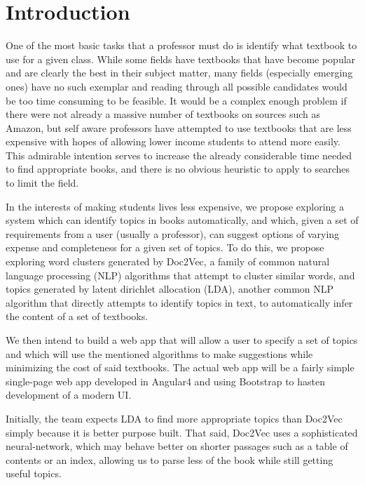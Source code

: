
\section{Introduction}
One of the most basic tasks that a professor must do is identify what textbook to use for a given class.
While some fields have textbooks that have become popular and are clearly the best in their subject matter, many fields (especially emerging ones) have no such exemplar and reading through all possible candidates would be too time consuming to be feasible.  
It would be a complex enough problem if there were not already a massive number of textbooks on sources such as Amazon, but self aware professors have attempted to use textbooks that are less expensive with hopes of allowing lower income students to attend more easily.  
This admirable intention serves to increase the already considerable time needed to find appropriate books, and there is no obvious heuristic to apply to searches to limit the field.  

In the interests of making students lives less expensive, we propose exploring a system which can identify topics in books automatically, and which, given a set of requirements from a user (usually a professor), can suggest options of varying expense and completeness for a given set of topics.  
To do this, we propose exploring word clusters generated by Doc2Vec, a family of common natural language processing (NLP) algorithms that attempt to cluster similar words, and topics generated by latent dirichlet allocation (LDA), another common NLP algorithm that directly attempts to identify topics in text, to automatically infer the content of a set of textbooks.  

We then intend to build a web app that will allow a user to specify a set of topics and which will use the mentioned algorithms to make suggestions while minimizing the cost of said textbooks.  
The actual web app will be a fairly simple single-page web app developed in Angular4 and using Bootstrap to hasten development of a modern UI.  

Initially, the team expects LDA to find more appropriate topics than Doc2Vec simply because it is better purpose built.
That said, Doc2Vec uses a sophisticated neural-network, which may behave better on shorter passages such as a table of contents or an index, allowing us to parse less of the book while still getting useful topics.  